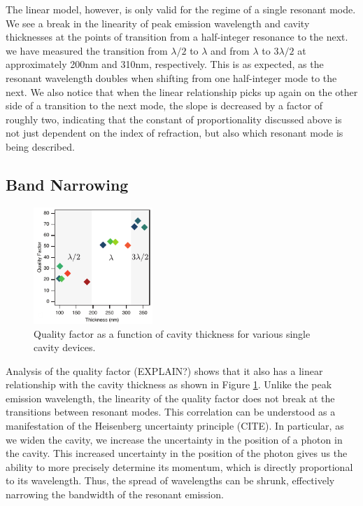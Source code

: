 \documentclass{report}
\begin{document}
            The linear model, however, is only valid for the regime of a single resonant mode. We see a break in the linearity of peak emission wavelength and cavity thicknesses at the points of transition from a half-integer resonance to the next. we have measured the transition from $\lambda/2$ to $\lambda$ and from $\lambda$ to $3\lambda/2$ at approximately 200nm and 310nm, respectively. This is as expected, as the resonant wavelength doubles when shifting from one half-integer mode to the next. We also notice that when the linear relationship picks up again on the other side of a transition to the next mode, the slope is decreased by a factor of roughly two, indicating that the constant of proportionality discussed above is not just dependent on the index of refraction, but also which resonant mode is being described.
        
        \subsection{Band Narrowing} \label{bandwidth}
            \begin{figure}
                \centering
                \includegraphics[width=0.4\textwidth]{images/n1_quality_factor.png}
                \caption{\small Quality factor as a function of cavity thickness for various single cavity devices.}
                \label{fig:bandwidth}
            \end{figure}

            Analysis of the quality factor (EXPLAIN?) shows that it also has a linear relationship with the cavity thickness as shown in Figure \ref{fig:bandwidth}. Unlike the peak emission wavelength, the linearity of the quality factor does not break at the transitions between resonant modes. This correlation can be understood as a manifestation of the Heisenberg uncertainty principle (CITE). In particular, as we widen the cavity, we increase the uncertainty in the position of a photon in the cavity. This increased uncertainty in the position of the photon gives us the ability to more precisely determine its momentum, which is directly proportional to its wavelength. Thus, the spread of wavelengths can be shrunk, effectively narrowing the bandwidth of the resonant emission.
\end{document}
